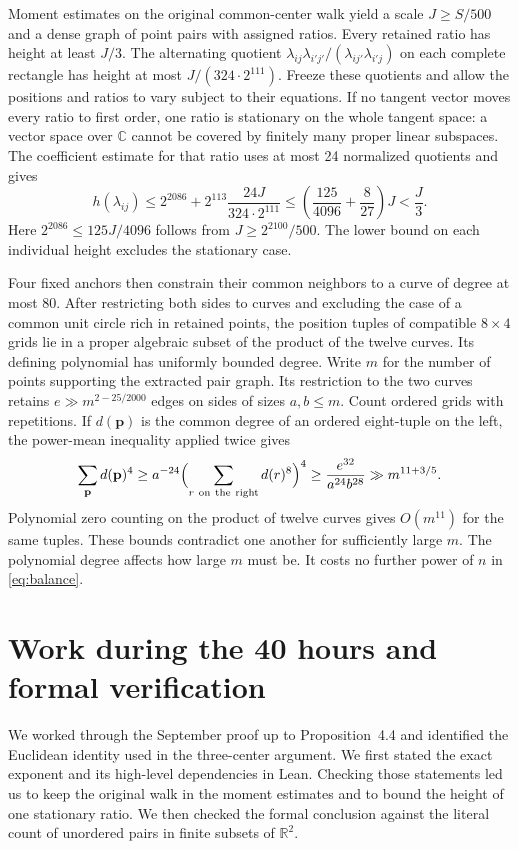 \documentclass[11pt,letterpaper,oneside,reqno]{amsart}
\theoremstyle{definition}
\begin{document}
Moment estimates on the original common-center walk yield a scale
\(J\ge S/500\) and a dense graph of point pairs with assigned ratios.
Every retained ratio has height at least \(J/3\). The alternating
quotient \(\lambda_{ij}\lambda_{i'j'}/(\lambda_{ij'}\lambda_{i'j})\)
on each complete rectangle has height at most
\(J/(324\cdot 2^{111})\). Freeze these quotients and allow the positions
and ratios to vary subject to their equations. If no tangent vector
moves every ratio to first order, one ratio is stationary on the whole
tangent space: a vector space over \(\mathbb C\) cannot be covered by
finitely many proper linear subspaces. The
coefficient estimate for that ratio uses at most 24 normalized quotients
and gives
\[
 h(\lambda_{ij})\le 2^{2086}
  +2^{113}\frac{24J}{324\cdot2^{111}}
 \le\left(\frac{125}{4096}+\frac{8}{27}\right)J<\frac{J}{3}.
\]
Here \(2^{2086}\le 125J/4096\) follows from \(J\ge2^{2100}/500\).
The lower bound on each individual height excludes the stationary case.

Four fixed anchors then constrain their common neighbors to a curve of
degree at most \(80\). After restricting both sides to curves and
excluding the case of a common unit circle rich in retained points, the
position tuples of compatible \(8\times4\) grids lie in a proper
algebraic subset of the product of the twelve curves. Its defining
polynomial has uniformly bounded degree. Write \(m\) for the number of
points supporting the extracted pair graph. Its restriction to the two
curves retains \(e\gg m^{2-25/2000}\) edges on sides of sizes \(a,b\le m\).
Count ordered grids with repetitions. If \(d(\mathbf p)\) is the common
degree of an ordered eight-tuple on the left, the power-mean inequality
applied twice gives
\[
 \sum_{\mathbf p}d(\mathbf p)^4
 \ge a^{-24}\Bigl(\sum_{r\ {\rm on\ the\ right}}d(r)^8\Bigr)^4
 \ge \frac{e^{32}}{a^{24}b^{28}}
 \gg m^{11+3/5}.
\]
Polynomial zero counting on the product of twelve curves gives
\(O(m^{11})\) for the same tuples. These bounds contradict one another for sufficiently large
\(m\). The polynomial degree affects how large \(m\) must be. It costs
no further power of \(n\) in \eqref{eq:balance}.

\section{Work during the 40 hours and formal verification}
We worked through the September proof up to Proposition~4.4 and
identified the Euclidean identity used in the three-center argument.
We first stated the exact exponent and its high-level dependencies in
Lean. Checking those statements led us to keep the original walk in the
moment estimates and to bound the height of one stationary ratio.
We then checked the formal conclusion against the literal count of
unordered pairs in finite subsets of \(\mathbb R^2\).
\end{document}
